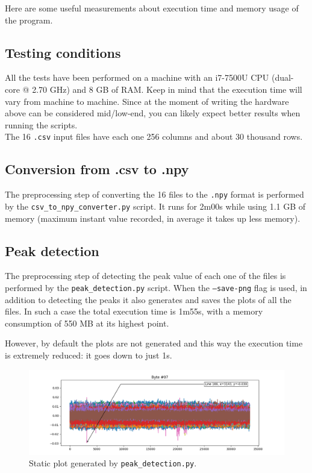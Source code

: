 \documentclass[11pt,a4paper]{article}
\begin{document}
Here are some useful measurements about execution time and memory usage of the program.

\subsection{Testing conditions}

All the tests have been performed on a machine with an i7-7500U CPU (dual-core @ 2.70 GHz) and 8 GB of RAM.
Keep in mind that the execution time will vary from machine to machine.
Since at the moment of writing the hardware above can be considered mid/low-end, you can likely expect better results when running the scripts.\\

The 16 \texttt{.csv} input files have each one 256 columns and about 30 thousand rows.

\subsection{Conversion from .csv to .npy}

The preprocessing step of converting the 16 files to the \texttt{.npy} format is performed by the \texttt{csv\_to\_npy\_converter.py} script.
It runs for 2m00s while using 1.1 GB of memory (maximum instant value recorded, in average it takes up less memory).

\subsection{Peak detection}

The preprocessing step of detecting the peak value of each one of the files is performed by the \texttt{peak\_detection.py} script.
When the \texttt{--save-png} flag is used, in addition to detecting the peaks it also generates and saves the plots of all the files.
In such a case the total execution time is 1m55s, with a memory consumption of 550 MB at its highest point.

However, by default the plots are not generated and this way the execution time is extremely reduced: it goes down to just 1s.

\begin{figure}[H]
    \centering
    \includegraphics[scale=0.55]{static_plot.png}
    \caption{Static plot generated by \texttt{peak\_detection.py}.}
    \label{fig:static_plot}
\end{figure}
\end{document}
